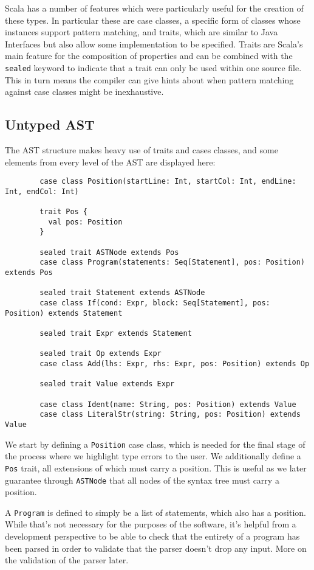 \documentclass[british, twoside, openright]{bhamthesis}
\theoremstyle{definition}
\begin{document}
    Scala has a number of features which were particularly useful for the creation of these types. In particular these are case classes, a specific form of classes whose instances support pattern matching, and traits, which are similar to Java Interfaces but also allow some implementation to be specified. Traits are Scala's main feature for the composition of properties and can be combined with the \texttt{sealed} keyword to indicate that a trait can only be used within one source file. This in turn means the compiler can give hints about when pattern matching against case classes might be inexhaustive.

    \subsection{Untyped AST}
      The AST structure makes heavy use of traits and cases classes, and some elements from every level of the AST are displayed here:
      \begin{lstlisting}
        case class Position(startLine: Int, startCol: Int, endLine: Int, endCol: Int)

        trait Pos {
          val pos: Position
        }

        sealed trait ASTNode extends Pos
        case class Program(statements: Seq[Statement], pos: Position) extends Pos

        sealed trait Statement extends ASTNode
        case class If(cond: Expr, block: Seq[Statement], pos: Position) extends Statement

        sealed trait Expr extends Statement

        sealed trait Op extends Expr
        case class Add(lhs: Expr, rhs: Expr, pos: Position) extends Op

        sealed trait Value extends Expr

        case class Ident(name: String, pos: Position) extends Value
        case class LiteralStr(string: String, pos: Position) extends Value
      \end{lstlisting}

      We start by defining a \texttt{Position} case class, which is needed for the final stage of the process where we highlight type errors to the user. We additionally define a \texttt{Pos} trait, all extensions of which must carry a position. This is useful as we later guarantee through \texttt{ASTNode} that all nodes of the syntax tree must carry a position.

      A \texttt{Program} is defined to simply be a list of statements, which also has a position. While that's not necessary for the purposes of the software, it's helpful from a development perspective to be able to check that the entirety of a program has been parsed in order to validate that the parser doesn't drop any input. More on the validation of the parser later.
\end{document}
